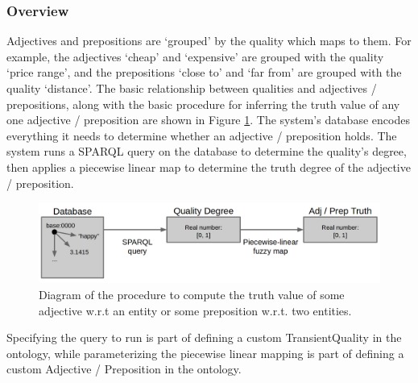 \documentclass[titlepage]{article}
\begin{document}
\subsubsection{Overview}

Adjectives and prepositions are `grouped' by the quality which maps to them. 
For example, the adjectives `cheap' and `expensive' are grouped with the quality `price range', and the prepositions `close to' and `far from' are grouped with the quality `distance'.
The basic relationship between qualities and adjectives / prepositions, along with the basic procedure for inferring the truth value of any one adjective / preposition are shown in Figure \ref{fig:quality_computation}.
The system's database encodes everything it needs to determine whether an adjective / preposition holds.
The system runs a SPARQL query on the database to determine the quality's degree, then applies a piecewise linear map to determine the truth degree of the adjective / preposition.


\begin{figure}[h!]
\centering
\includegraphics[width=\textwidth]{QualityComputation}
\caption{Diagram of the procedure to compute the truth value of some adjective w.r.t an entity or some preposition w.r.t. two entities.}
\label{fig:quality_computation}
\end{figure}


Specifying the query to run is part of defining a custom TransientQuality in the ontology, while parameterizing the piecewise linear mapping is part of defining a custom Adjective / Preposition in the ontology.


\end{document}
